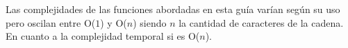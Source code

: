 Las complejidades de las funciones abordadas en esta guía varían según su uso pero oscilan entre O($1$) y O($n$) siendo $n$ la cantidad de caracteres de la cadena. En cuanto a la complejidad temporal si es O($n$). 